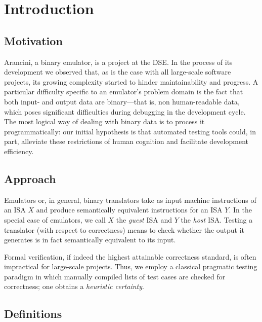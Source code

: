 
\chapter{Introduction}\label{chapter:introduction}

\section{Motivation}

Arancini, a binary emulator, is a project at the \ac{DSE}. In the process of its development we observed that, as is the
case with all large-scale software projects, its growing complexity started to hinder maintainability and progress. A
particular difficulty specific to an emulator's problem domain is the fact that both input- and output data are
binary---that is, non human-readable data, which poses significant difficulties during debugging in the development
cycle. The most logical way of dealing with binary data is to process it programmatically: our initial hypothesis is
that automated testing tools could, in part, alleviate these restrictions of human cognition and facilitate development
efficiency.

\section{Approach}

Emulators or, in general, binary translators take as input machine instructions of an \ac{ISA} $X$ and produce
semantically equivalent instructions for an \ac{ISA} $Y$. In the special case of emulators, we call $X$ the
\textit{guest} \ac{ISA} and $Y$ the \textit{host} \ac{ISA}. Testing a translator (with respect to correctness) means to
check whether the output it generates is in fact semantically equivalent to its input.

Formal verification, if indeed the highest attainable correctness standard, is often impractical for large-scale
projects. Thus, we employ a classical pragmatic testing paradigm in which manually compiled lists of test cases are
checked for correctness; one obtains a \textit{heuristic certainty}.

\section{Definitions}\label{sec:definitions}

